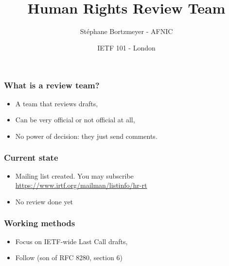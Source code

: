 \documentclass[ignorenonframetext]{beamer}
\title{Human Rights Review Team}
\author{Stéphane Bortzmeyer - AFNIC}
\date{IETF 101 - London}
\begin{document}
\begin{frame}
\maketitle  
\end{frame}

\begin{frame}
  \frametitle{What is a review team?}
  \begin{itemize}
  \item<2->A team that reviews drafts,
  \item<3->Can be very official or not official at all,
  \item<4->No power of decision: they just send comments.  
  \end{itemize}
\end{frame}

\begin{frame}
  \frametitle{Current state}
  \begin{itemize}
  \item<2->Mailing list created. You may subscribe
    \url{https://www.irtf.org/mailman/listinfo/hr-rt}
  \item<3->No review done yet  
  \end{itemize}
\end{frame}

\begin{frame}
  \frametitle{Working methods}
  \begin{itemize}
  \item<2->Focus on IETF-wide Last Call drafts,
  \item<3->Follow  (son of RFC 8280,
    section 6)
  \end{itemize}
\end{frame}
\end{document}
